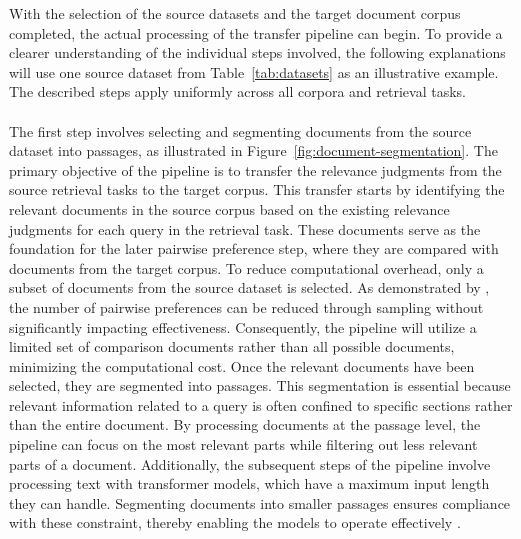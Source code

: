 With the selection of the source datasets and the target document corpus \mbox{completed}, the actual processing of the transfer pipeline can begin. To \mbox{provide} a clearer understanding of the individual steps involved, the following explanations will use one source dataset from Table~\ref{tab:datasets} as an illustrative example. The described steps apply uniformly across all corpora and retrieval tasks.
\\\\
The first step involves selecting and segmenting documents from the source dataset into passages, as illustrated in Figure~\ref{fig:document-segmentation}. The primary objective of the pipeline is to transfer the relevance judgments from the source retrieval tasks to the target corpus. This transfer starts by identifying the relevant documents in the source corpus based on the existing relevance judgments for each query in the retrieval task. These documents serve as the foundation for the later pairwise preference step, where they are compared with documents from the target corpus. To reduce computational overhead, only a subset of documents from the source dataset is selected. As demonstrated by \mbox{\citet{gienapp:2022}}, the number of pairwise preferences can be reduced through sampling without significantly impacting effectiveness. Consequently, the pipeline will utilize a limited set of comparison documents rather than all possible documents, minimizing the computational cost. Once the relevant documents have been selected, they are segmented into passages. This segmentation is essential because relevant information related to a query is often confined to specific sections rather than the entire document. By processing documents at the passage level, the pipeline can focus on the most relevant parts while filtering out less relevant parts of a document. Additionally, the subsequent steps of the pipeline involve processing text with transformer models, which have a maximum input length they can handle. Segmenting documents into smaller passages ensures compliance with these constraint, thereby enabling the models to operate effectively \citep{levy:2024}.

